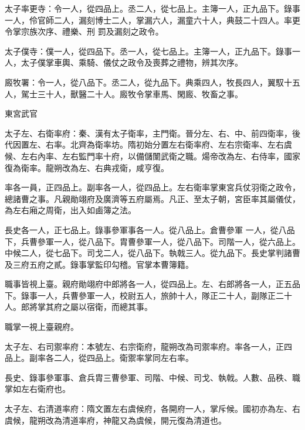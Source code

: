 \begin{pinyinscope}
 太子率更寺：令一人，從四品上。丞二人，從七品上。主簿一人，正九品下。錄事一人，伶官師二人，漏刻博士二人，掌漏六人，漏童六十人，典鼓二十四人。率更令掌宗族次序、禮樂、刑
 罰及漏刻之政令。



 太子僕寺：僕一人，從四品下。丞一人，從七品上。主簿一人，正九品下。錄事一人，太子僕掌車輿、乘騎、儀仗之政令及喪葬之禮物，辨其次序。



 廄牧署：令一人，從八品下。丞二人，從九品下。典乘四人，牧長四人，翼馭十五人，駕士三十人，獸醫二十人。廄牧令掌車馬、閑廄、牧畜之事。



 東宮武官



 太子左、右衛率府：秦、漢有太子衛率，主門衛。晉分左、右、中、前四衛率，後代因置左、右率。北齊為衛率坊。隋初始分置左右衛率府、左右宗衛率、左右虞候、左右內率、左右監門率十府，以備儲闈武衛之職。煬帝改為左、右侍率，國家復為衛率。龍朔改為左、右典戎衛，咸亨復。



 率各一員，正四品上。副率各一人，從四品上。左右衛率掌東宮兵仗羽衛之政令，總諸曹之事。凡親勛翊府及廣濟等五府屬焉。凡正、至太子朝，宮臣率其屬儀仗，為左右廂之周衛，出入如鹵簿之法。



 長史各一人，正七品上。錄事參軍事各一人。從八品上。倉曹參軍
 一人，從八品下，兵曹參軍一人，從八品下。胄曹參軍一人，從八品下。司階一人，從六品上。中候二人，從七品下。司戈二人，從八品下。執戟三人。從九品下。長史掌判諸曹及三府五府之貳。錄事掌監印勾稽。官掌本曹簿籍。



 職事皆視上臺。親府勛翊府中郎將各一人，從四品上。左、右郎將各一人，正五品下。錄事一人，兵曹參軍一人，校尉五人，旅帥十人，隊正二十人，副隊正二十人。郎將掌其府之屬以宿衛，而總其事。



 職掌一視上臺親府。



 太子左、右司禦率府：本號左、右宗衛府，龍朔改為司禦率府。率各一人，正四
 品上。副率各二人，從四品上。衛禦率掌同左右率。



 長史、錄事參軍事、倉兵胄三曹參軍、司階、中候、司戈、執戟。人數、品秩、職掌如左右衛府也。



 太子左、右清道率府：隋文置左右虞候府，各開府一人，掌斥候。國初亦為左、右虞候，龍朔改為清道率府，神龍又為虞候，開元復為清道也。




\end{pinyinscope}
